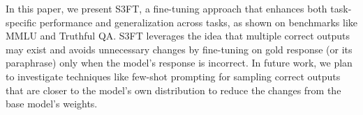 In this paper, we present S3FT, a fine-tuning approach that enhances both task-specific performance and generalization across tasks, as shown on benchmarks like MMLU and Truthful QA. S3FT leverages the idea that multiple correct outputs may exist and avoids unnecessary changes by fine-tuning on gold response (or its paraphrase) only when the model's response is incorrect. In future work, we plan to investigate techniques like few-shot prompting for sampling correct outputs that are closer to the model's own distribution to reduce the changes from the base model's weights.